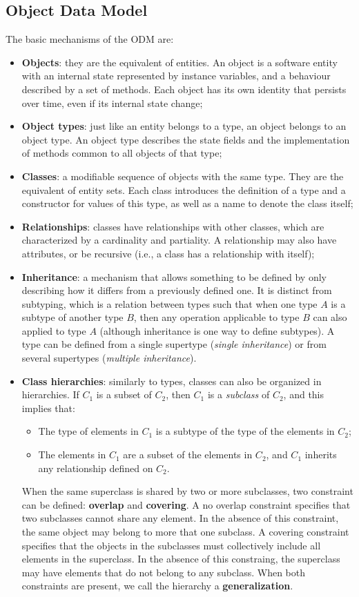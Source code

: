 \subsection{Object Data Model}
The basic mechanisms of the ODM are:
\begin{itemize}
    \item \textbf{Objects}: they are the equivalent of entities. An object is a software entity with an internal state represented by instance variables, and a behaviour described by a set of methods. Each object has its own identity that persists over time, even if its internal state change;
    \item \textbf{Object types}: just like an entity belongs to a type, an object belongs to an object type. An object type describes the state fields and the implementation of methods common to all objects of that type;
    \item \textbf{Classes}: a modifiable sequence of objects with the same type. They are the equivalent of entity sets. Each class introduces the definition of a type and a constructor for values of this type, as well as a name to denote the class itself;
    \item \textbf{Relationships}: classes have relationships with other classes, which are characterized by a cardinality and partiality. A relationship may also have attributes, or be recursive (i.e., a class has a relationship with itself);
    \item \textbf{Inheritance}: a mechanism that allows something to be defined by only describing how it differs from a previously defined one. It is distinct from subtyping, which is a relation between types such that when one type $A$ is a subtype of another type $B$, then any operation applicable to type $B$ can also applied to type $A$ (although inheritance is one way to define subtypes). A type can be defined from a single supertype (\textit{single inheritance}) or from several supertypes (\textit{multiple inheritance}).
    \item \textbf{Class hierarchies}: similarly to types, classes can also be organized in hierarchies. If $C_1$ is a subset of $C_2$, then $C_1$ is a \textit{subclass} of $C_2$, and this implies that:
        \begin{itemize}[noitemsep]
            \item The type of elements in $C_1$ is a subtype of the type of the elements in $C_2$;
            \item The elements in $C_1$ are a subset of the elements in $C_2$, and $C_1$ inherits any relationship defined on $C_2$.
        \end{itemize}
    When the same superclass is shared by two or more subclasses, two constraint can be defined: \textbf{overlap} and \textbf{covering}. A no overlap constraint specifies that two subclasses cannot share any element. In the absence of this constraint, the same object may belong to more that one subclass. A covering constraint specifies that the objects in the subclasses must collectively include all elements in the superclass. In the absence of this constraing, the superclass may have elements that do not belong to any subclass. When both constraints are present, we call the hierarchy a \textbf{generalization}.
\end{itemize}
